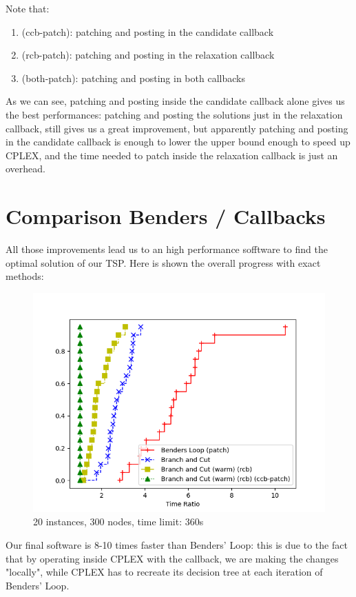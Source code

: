 Note that:
\begin{enumerate}
    \item (ccb-patch): patching and posting in the candidate callback
    \item (rcb-patch): patching and posting in the relaxation callback
    \item (both-patch): patching and posting in both callbacks
\end{enumerate}

As we can see, patching and posting inside the candidate callback alone gives us the best performances: patching and posting the solutions just in the relaxation callback, still gives us a great improvement, but apparently patching and posting in the candidate callback is enough to lower the upper bound enough to speed up CPLEX, and the time needed to patch inside the relaxation callback is just an overhead.

\section{Comparison Benders / Callbacks}
All those improvements lead us to an high performance sofftware to find the optimal solution of our TSP. Here is shown the overall progress with exact methods:

\FloatBarrier
\begin{figure}[h]
    \centering
    \includegraphics*[width=.6\textwidth]{../plots/perfprof_exact_times_result.png}
    \caption*{20 instances, 300 nodes, time limit: 360s}
\end{figure}
\FloatBarrier

Our final software is 8-10 times faster than Benders' Loop: this is due to the fact that by operating inside CPLEX with the callback, we are making the changes "locally", while CPLEX has to recreate its decision tree at each iteration of Benders' Loop.